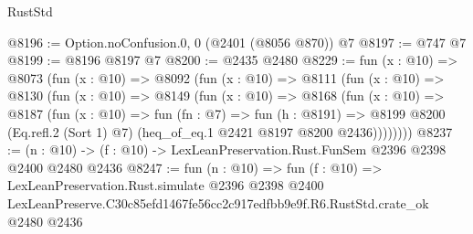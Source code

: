 \begin{lexlean}{RustStd}
\begin{coremodule}
@8196 := Option.noConfusion.{0, 0} (@2401 (@8056 @870)) @7
@8197 := @747 @7
@8199 := @8196 @8197 @7
@8200 := @2435 @2480
@8229 := fun (x : @10) =>
  @8073
    (fun (x : @10) =>
    @8092
      (fun (x : @10) =>
      @8111
        (fun (x : @10) =>
        @8130
          (fun (x : @10) =>
          @8149
            (fun (x : @10) =>
            @8168
              (fun (x : @10) =>
              @8187
                (fun (x : @10) =>
                fun (fn : @7) =>
                fun (h : @8191) =>
                @8199 @8200 (Eq.refl.{2} (Sort 1) @7) (heq_of_eq.{1} @2421 @8197 @8200 @2436))))))))
@8237 := (n : @10) -> (f : @10) -> LexLeanPreservation.Rust.FunSem @2396 @2398 @2400 @2480 @2436
@8247 := fun (n : @10) =>
  fun (f : @10) =>
  LexLeanPreservation.Rust.simulate
    @2396
    @2398
    @2400
    LexLeanPreserve.C30c85efd1467fe56cc2c917edfbb9e9f.R6.RustStd.crate_ok
    @2480
    @2436
\end{coremodule}
\end{lexlean}
